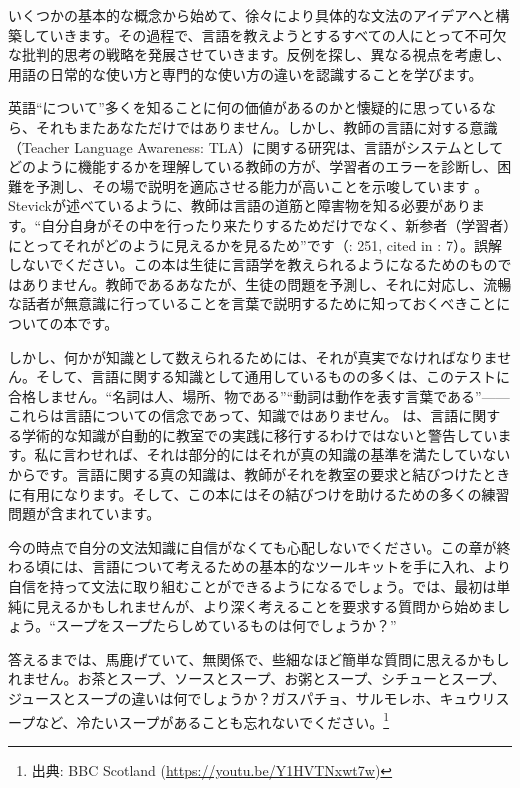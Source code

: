 いくつかの基本的な概念から始めて、徐々により具体的な文法のアイデアへと構築していきます。その過程で、言語を教えようとするすべての人にとって不可欠な批判的思考の戦略を発展させていきます。反例を探し、異なる視点を考慮し、用語の日常的な使い方と専門的な使い方の違いを認識することを学びます。

英語\enquote{について}多くを知ることに何の価値があるのかと懐疑的に思っているなら、それもまたあなただけではありません。しかし、教師の言語に対する意識（Teacher Language Awareness: TLA）に関する研究は、言語がシステムとしてどのように機能するかを理解している教師の方が、学習者のエラーを診断し、困難を予測し、その場で説明を適応させる能力が高いことを示唆しています \autocite{Andrews2007}。Stevickが述べているように、教師は言語の道筋と障害物を知る必要があります。\enquote{自分自身がその中を行ったり来たりするためだけでなく、新参者（学習者）にとってそれがどのように見えるかを見るため}です（\citeyear{Stevick1980}: 251, cited in \citealt{Andrews2007}: 7）。誤解しないでください。この本は生徒に言語学を教えられるようになるためのものではありません。教師であるあなたが、生徒の問題を予測し、それに対応し、流暢な話者が無意識に行っていることを言葉で説明するために知っておくべきことについての本です。

しかし、何かが知識として数えられるためには、それが真実でなければなりません。そして、言語に関する知識として通用しているものの多くは、このテストに合格しません。\enquote{名詞は人、場所、物である}\enquote{動詞は動作を表す言葉である}——これらは言語についての信念であって、知識ではありません。\textcite{Bartels2009} は、言語に関する学術的な知識が自動的に教室での実践に移行するわけではないと警告しています。私に言わせれば、それは部分的にはそれが真の知識の基準を満たしていないからです。言語に関する真の知識は、教師がそれを教室の要求と結びつけたときに有用になります。そして、この本にはその結びつけを助けるための多くの練習問題が含まれています。

今の時点で自分の文法知識に自信がなくても心配しないでください。この章が終わる頃には、言語について考えるための基本的なツールキットを手に入れ、より自信を持って文法に取り組むことができるようになるでしょう。では、最初は単純に見えるかもしれませんが、より深く考えることを要求する質問から始めましょう。\enquote{スープをスープたらしめているものは何でしょうか？}

答えるまでは、馬鹿げていて、無関係で、些細なほど簡単な質問に思えるかもしれません。お茶とスープ、ソースとスープ、お粥とスープ、シチューとスープ、ジュースとスープの違いは何でしょうか？ガスパチョ、サルモレホ、キュウリスープなど、冷たいスープがあることも忘れないでください。\footnote{出典: BBC Scotland (\url{https://youtu.be/Y1HVTNxwt7w})}

